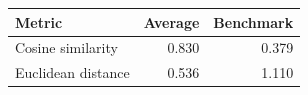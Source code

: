 
\begin{tabular}{lrr}
\toprule
Metric & Average & Benchmark\\
\midrule
Cosine similarity & 0.830 & 0.379\\
Euclidean distance & 0.536 & 1.110\\
\bottomrule
\end{tabular}
